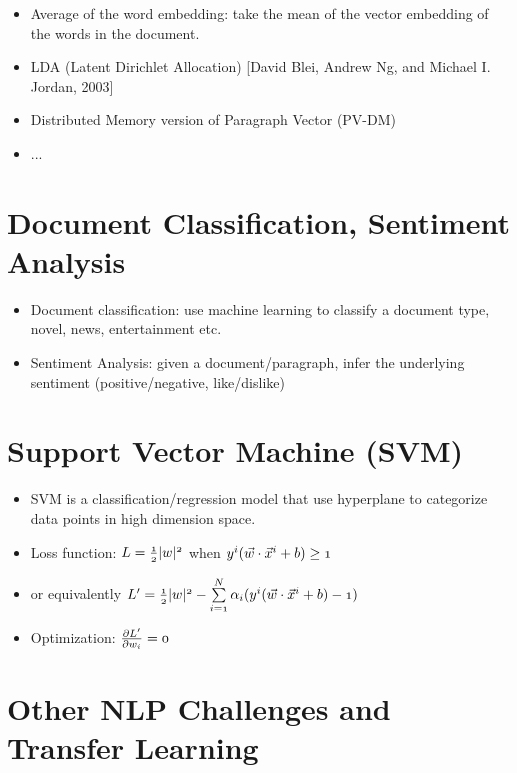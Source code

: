 \documentclass[12pt, oneside]{article}
\begin{document}
\begin{itemize}
\item Average of the word embedding: take the mean of the vector embedding of the words in the document. 
\item LDA (Latent Dirichlet Allocation) [David Blei, Andrew Ng, and Michael I. Jordan, 2003]
\item Distributed Memory version of Paragraph Vector (PV-DM)
\item ...
\end{itemize}




\section{Document Classification, Sentiment Analysis}
\begin{itemize}
\item Document classification: use machine learning to classify a document type, novel, news, entertainment etc. 
\item Sentiment Analysis: given a document/paragraph, infer the underlying sentiment (positive/negative, like/dislike)
\end{itemize}



\section{Support Vector Machine (SVM)}

\begin{itemize}
\item SVM is a classification/regression model that use hyperplane to categorize data points in high dimension space. 
\item Loss function: $\mathnormal{L=\frac{1}{2}|w|^2}$ when $\mathnormal{y^i (\vec{w}\cdot \vec{x}^i+b)\geq 1}$
\item or equivalently  $\mathnormal{L'=\frac{1}{2}|w|^2-\sum\limits_{i=1}^N \alpha_i (y^i (\vec{w}\cdot \vec{x}^i+b)-1)}$ 
\item Optimization: $\mathnormal{\frac{\partial L'}{\partial w_i}=0}$
\end{itemize}




\section{Other NLP Challenges and Transfer Learning}
\end{document}
